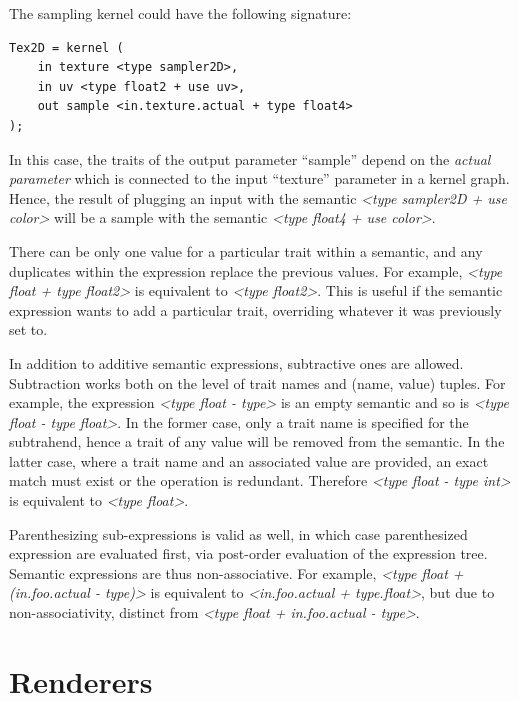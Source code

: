 The sampling kernel could have the following signature:

\noindent\begin{minipage}{\textwidth}
\begin{lstlisting}[frame=single]
Tex2D = kernel (
    in texture <type sampler2D>,
    in uv <type float2 + use uv>,
    out sample <in.texture.actual + type float4>
);
\end{lstlisting}
\end{minipage}


In this case, the traits of the output parameter ``sample'' depend on the \emph{actual parameter} which is connected to the input ``texture'' parameter in a kernel graph. Hence, the result of plugging an input with the semantic \emph{<type sampler2D + use color>} will be a sample with the semantic \emph{<type float4 + use color>}.

There can be only one value for a particular trait within a semantic, and any duplicates within the expression replace the previous values. For example, \emph{<type float + type float2>} is equivalent to \emph{<type float2>}. This is useful if the semantic expression wants to add a particular trait, overriding whatever it was previously set to.

In addition to additive semantic expressions, subtractive ones are allowed. Subtraction works both on the level of trait names and (name, value) tuples. For example, the expression \emph{<type float - type>} is an empty semantic and so is \emph{<type float - type float>}. In the former case, only a trait name is specified for the subtrahend, hence a trait of any value will be removed from the semantic. In the latter case, where a trait name and an associated value are provided, an exact match must exist or the operation is redundant. Therefore \emph{<type float - type int>} is equivalent to \emph{<type float>}.

Parenthesizing sub-expressions is valid as well, in which case parenthesized expression are evaluated first, via post-order evaluation of the expression tree. Semantic expressions are thus non-associative. For example, \emph{<type float + (in.foo.actual - type)>} is equivalent to \emph{<in.foo.actual + type.float>}, but due to non-associativity, distinct from \emph{<type float + in.foo.actual - type>}.

\section{Renderers}
\label{sec:Renderers}

